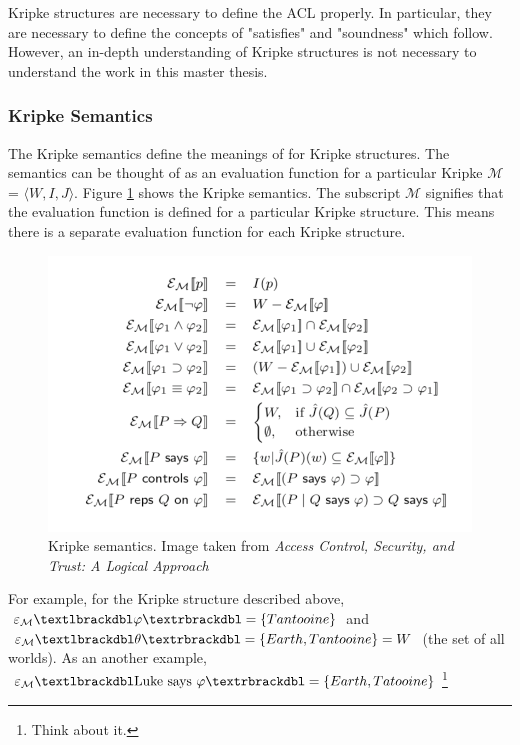 \documentclass[../../main/main.tex]{subfiles}
\begin{document}
Kripke structures are necessary to define the ACL properly.  In particular, they are necessary to define the concepts of "satisfies" and "soundness" which follow.  However, an in-depth understanding of Kripke structures is not necessary to understand the work in this master thesis.  

\subsubsection{Kripke Semantics}
The Kripke semantics define the meanings of  for Kripke structures.  The semantics can be thought of as an evaluation function for a particular Kripke $\mathcal{M}$ = $\langle \textit{W}, \textit{I}, \textit{J} \rangle $.  Figure \ref{kripkesemantics} shows the Kripke semantics.  The subscript $\mathcal{M}$ signifies that the evaluation function is defined for a particular Kripke structure.  This means there is a separate evaluation function for each Kripke structure.


\begin{figure}[h]
\centering
\includegraphics{../figures/kripkesemantics}
\caption{\label{kripkesemantics} Kripke semantics. Image taken from \textit{Access Control, Security, and Trust: A Logical Approach}\cite{ChinOlder}}
\end{figure}

For example, for the Kripke structure described above, $\varepsilon_{\mathcal{M}}\textlbrackdbl \varphi \textrbrackdbl  = \{Tantooine\}$ and $\varepsilon_{\mathcal{M}}\textlbrackdbl \theta \textrbrackdbl  = \{Earth, Tantooine\} = W$ (the set of all worlds).  As an another example, $\varepsilon_{\mathcal{M}}\textlbrackdbl \text{Luke says $\varphi$} \textrbrackdbl = \{Earth, Tatooine\}$\footnote{Think about it.  }
\end{document}
